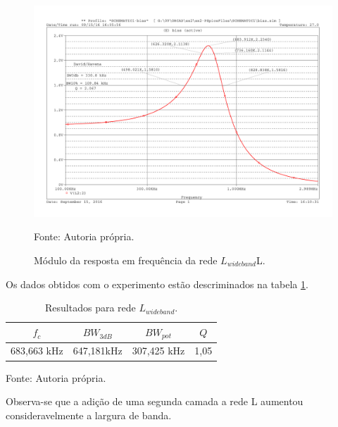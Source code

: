 \begin{figure}[H]
    \centering
    \caption{Módulo da resposta em frequência da rede $L_{wideband}$L.}
    \includegraphics[scale=0.5]{Imagens/ex2/fres.pdf}
    \label{f_rede_L_wideband_graph}
    
    \small Fonte: Autoria própria.
\end{figure}

Os dados obtidos com o experimento estão descriminados na tabela \ref{tab:reslwb}.

\begin{table}[H]
    \centering
    \caption{Resultados para rede $L_{wideband}$.}
    \label{tab:reslwb}
    \begin{tabular}{cccc}
        \hline
        $f_c$ & $BW_{3dB}$ & $BW_{pot}$ & $Q$ \\
        \hline
        683,663 kHz & 647,181kHz & 307,425 kHz & 1,05 \\
        \hline
    \end{tabular}
    
    \small Fonte: Autoria própria.
\end{table}

Observa-se que a adição de uma segunda camada a rede L aumentou consideravelmente a largura de banda.
